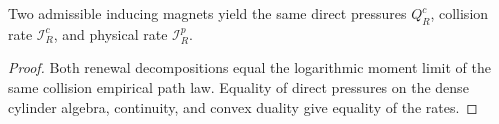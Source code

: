 \begin{proposition}
\label{prop:r3-a3-independent}
Two admissible inducing magnets yield the same direct pressures
\(Q_R^c\), collision rate \(\mathcal I_R^c\), and physical rate
\(\mathcal I_R^p\).
\end{proposition}

\begin{proof}
Both renewal decompositions equal the logarithmic moment limit of the same
collision empirical path law.  Equality of direct pressures on the dense
cylinder algebra, continuity, and convex duality give equality of the rates.
\end{proof}

